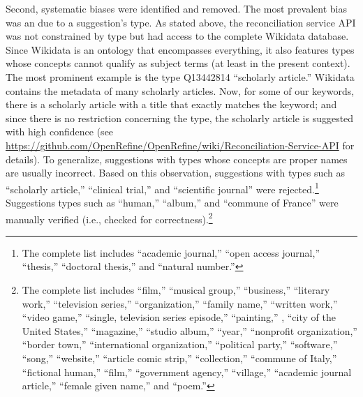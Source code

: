 Second, systematic biases were identified and removed. The most
prevalent bias was an due to a suggestion's type. As stated above, the
reconciliation service API was not constrained by type but had access to
the complete Wikidata database. Since Wikidata is an ontology that
encompasses everything, it also features types whose concepts cannot
qualify as subject terms (at least in the present context). The most
prominent example is the type Q13442814 ``scholarly article.'' Wikidata
contains the metadata of many scholarly articles. Now, for some of our
keywords, there is a scholarly article with a title that exactly matches
the keyword; and since there is no restriction concerning the type, the
scholarly article is suggested with high confidence (see
\url{https://github.com/OpenRefine/OpenRefine/wiki/Reconciliation-Service-API}
for details). To generalize, suggestions with types whose concepts are
proper names are usually incorrect. Based on this observation,
suggestions with types such as ``scholarly article,'' ``clinical
trial,'' and ``scientific journal'' were rejected.\footnote{The complete
  list includes ``academic journal,'' ``open access journal,''
  ``thesis,'' ``doctoral thesis,'' and ``natural number.''} Suggestions
types such as ``human,'' ``album,'' and ``commune of France'' were
manually verified (i.e., checked for correctness).\footnote{The complete
  list includes ``film,'' ``musical group,'' ``business,'' ``literary
  work,'' ``television series,'' ``organization,'' ``family name,''
  ``written work,'' ``video game,'' ``single, television series
  episode,'' ``painting,'' , ``city of the United States,''
  ``magazine,'' ``studio album,'' ``year,'' ``nonprofit organization,''
  ``border town,'' ``international organization,'' ``political party,''
  ``software,'' ``song,'' ``website,'' ``article comic strip,''
  ``collection,'' ``commune of Italy,'' ``fictional human,'' ``film,''
  ``government agency,'' ``village,'' ``academic journal article,''
  ``female given name,'' and ``poem.''}

